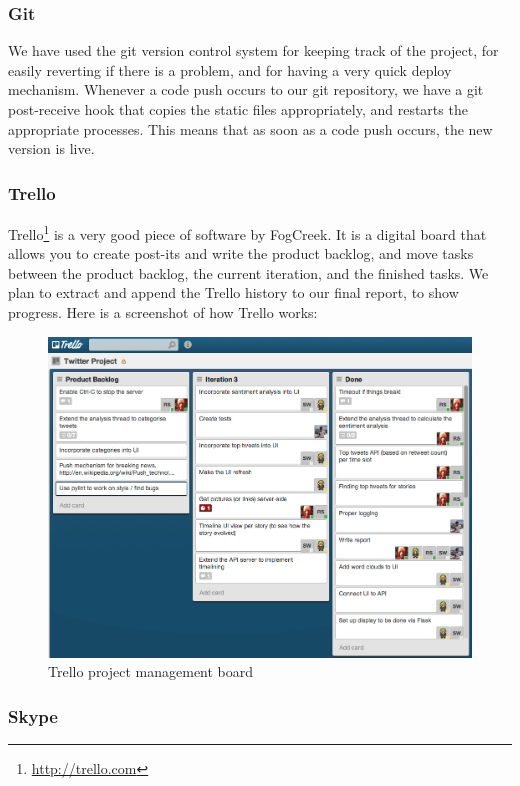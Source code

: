 \documentclass[a4paper,12pt]{article}
\begin{document}
			\subsubsection{Git}
			
			We have used the git version control system for keeping track of the project, for easily reverting if there is a problem, and for having a very quick deploy mechanism. Whenever a code push occurs to our git repository, we have a git post-receive hook that copies the static files appropriately, and restarts the appropriate processes. This means that as soon as a code push occurs, the new version is live.
			
			\subsubsection{Trello}
			
			Trello\footnote{\url{http://trello.com}} is a very good piece of software by FogCreek. It is a digital board that allows you to create post-its and write the product backlog, and move tasks between the product backlog, the current iteration, and the finished tasks. We plan to extract and append the Trello history to our final report, to show progress. Here is a screenshot of how Trello works:
			
			\begin{figure}[ht!]
						\centering
							\includegraphics[scale=0.4]{trello1.png}
						\caption{Trello project management board}
			\end{figure}
			
			\subsubsection{Skype}
			
\end{document}
